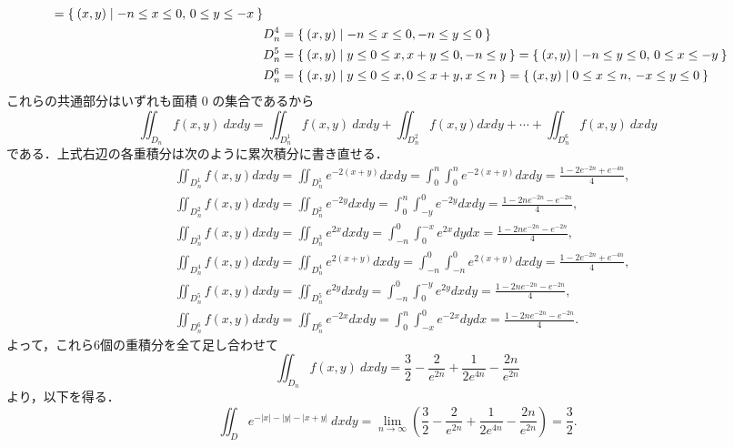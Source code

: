 \documentclass[11pt, uplatex, dvipdfmx]{jsarticle}
\begin{document}
\begin{enumerate}[(1)]
\begin{align*}
         = \Set{(x,y) | -n \leq x \leq 0, \, 0 \leq y \leq -x}\\
       & D_n^4 =\Set{(x,y)  |  -n \leq x \leq 0, -n \leq y \leq 0 }\\
       & D_n^5 =\Set{(x,y)  |  y \leq 0 \leq x, x+y \leq 0, -n \leq y}
         =\Set{(x,y) | -n \leq y \leq 0, \, 0 \leq x \leq -y}\\
       & D_n^6 =\Set{(x,y)  |  y \leq 0 \leq x, 0 \leq x+y, x \leq n}
         =\Set{(x,y) | 0 \leq x \leq n, \, -x \leq y \leq 0}
     \end{align*}
     これらの共通部分はいずれも面積 $0$ の集合であるから
     \[
       \iint_{D_n} f(x,y)\ dxdy= \iint_{D_n^1}f(x,y)\ dxdy+\iint_{D_n^2}f(x,y)dxdy+ \cdots
       + \iint_{D_n^6} f(x,y)\ dxdy
     \]
     である．上式右辺の各重積分は次のように累次積分に書き直せる．
     \begin{align*}
       &\iint_{D_n^1} f(x,y) dx dy=\iint_{D_n^1} e^{-2(x+y)} dxdy
         = \int_{0}^{n} \int_{0}^{n} e^{-2(x+y)} dx dy
         = \frac{1-2e^{-2n}+e^{-4n}}{4},\\
       &\iint_{D_n^2} f(x,y) dxdy = \iint_{D_n^2} e^{-2y} dxdy
         = \int_{0}^{n} \int_{-y}^{0} e^{-2y} dx dy
         = \frac{1-2ne^{-2n}-e^{-2n}}{4},\\
       &\iint_{D_n^3} f(x,y) dxdy = \iint_{D_n^3} e^{2x} dxdy
         = \int_{-n}^{0} \int_{0}^{-x} e^{2x} dy dx
         = \frac{1-2ne^{-2n}-e^{-2n}}{4},\\
       &\iint_{D_n^4} f(x,y) dxdy= \iint_{D_n^4} e^{2(x+y)}dxdy
         =\int_{-n}^{0} \int_{-n}^{0} e^{2(x+y)} dxdy
         = \frac{1-2e^{-2n}+e^{-4n}}{4},\\
       &\iint_{D_n^5} f(x,y) dxdy= \iint_{D_n^5} e^{2y}dxdy
         = \int_{-n}^{0} \int_{0}^{-y} e^{2y} dx dy
         = \frac{1-2ne^{-2n}-e^{-2n}}{4},\\
       &\iint_{D_n^6} f(x,y) dxdy = \iint_{D_n^6} e^{-2x}dxdy
         =\int_{0}^{n} \int_{-x}^{0} e^{-2x}dydx
         = \frac{1-2ne^{-2n}-e^{-2n}}{4}.
     \end{align*}
     よって，これら6個の重積分を全て足し合わせて
     \[
       \iint_{D_n} f(x,y) \ dx dy = \frac{3}{2} - \frac{2}{e^{2n}} + \frac{1}{2e^{4n}} - \frac{2n}{e^{2n}}
     \]
     より，以下を得る．
     \[
       \iint_{D} e^{-|x|-|y|-|x+y|} \ dx dy
       = \lim_{n \to \infty} \left(  \frac{3}{2} - \frac{2}{e^{2n}} + \frac{1}{2e^{4n}} - \frac{2n}{e^{2n}}\right)
       = \frac{3}{2}.
     \]

   \end{enumerate}
\end{document}
